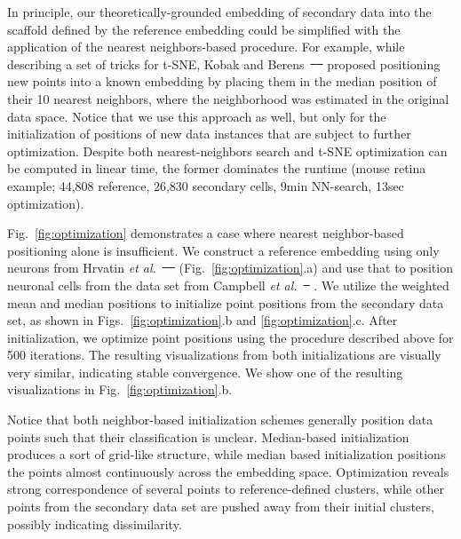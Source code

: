 \documentclass[runningheads]{llncs}
\newcommand{\etal}{\textit{et al.}}
\providecommand{\DIFaddtex}[1]{{\protect\color{blue}\uwave{#1}}} %
\providecommand{\DIFdeltex}[1]{{\protect\color{red}\sout{#1}}}                      %
\providecommand{\DIFaddbegin}{} %
\providecommand{\DIFaddend}{} %
\providecommand{\DIFdelbegin}{} %
\providecommand{\DIFdelend}{} %
\providecommand{\DIFadd}[1]{\texorpdfstring{\DIFaddtex{#1}}{#1}} %
\providecommand{\DIFdel}[1]{\texorpdfstring{\DIFdeltex{#1}}{}} %
\newcommand{\DIFscaledelfig}{0.5}
\newlength{\DIFdelgraphicswidth} %
\newlength{\DIFdelgraphicsheight} %
\newcommand{\DIFaddincludegraphics}[2][]{{\color{blue}\fbox{\DIFOincludegraphics[#1]{#2}}}} %
\newcommand{\DIFdelincludegraphics}[2][]{%
\sbox{\DIFdelgraphicsbox}{\DIFOincludegraphics[#1]{#2}}%
\settoboxwidth{\DIFdelgraphicswidth}{\DIFdelgraphicsbox} %
\settoboxtotalheight{\DIFdelgraphicsheight}{\DIFdelgraphicsbox} %
\scalebox{\DIFscaledelfig}{%
\parbox[b]{\DIFdelgraphicswidth}{\usebox{\DIFdelgraphicsbox}\\[-\baselineskip] \rule{\DIFdelgraphicswidth}{0em}}\llap{\resizebox{\DIFdelgraphicswidth}{\DIFdelgraphicsheight}{%
\setlength{\unitlength}{\DIFdelgraphicswidth}%
\begin{picture}(1,1)%
\thicklines\linethickness{2pt} %
{\color[rgb]{1,0,0}\put(0,0){\framebox(1,1){}}}%
{\color[rgb]{1,0,0}\put(0,0){\line( 1,1){1}}}%
{\color[rgb]{1,0,0}\put(0,1){\line(1,-1){1}}}%
\end{picture}%
}\hspace*{3pt}}} %
} %
\DeclareRobustCommand{\DIFaddbegin}{\DIFOaddbegin \let\includegraphics\DIFaddincludegraphics} %
\DeclareRobustCommand{\DIFaddend}{\DIFOaddend \let\includegraphics\DIFOincludegraphics} %
\DeclareRobustCommand{\DIFdelbegin}{\DIFOdelbegin \let\includegraphics\DIFdelincludegraphics} %
\DeclareRobustCommand{\DIFdelend}{\DIFOaddend \let\includegraphics\DIFOincludegraphics} %
\begin{document}
\DIFaddend In principle, our theoretically-grounded embedding of secondary data into the
scaffold defined by the reference embedding could be simplified with the
application of the nearest neighbors-based procedure. For example, while
describing a set of tricks for t-SNE, Kobak and Berens~\DIFdelbegin \DIFdel{\mbox{%
\cite{art_of_using_tsne}
}\hspace{0pt}%
}\DIFdelend \DIFaddbegin \DIFadd{\mbox{%
\cite{Kobak2019}
}\hspace{0pt}%
}\DIFaddend proposed positioning new points into a known embedding by placing them in the
median position of their 10 nearest neighbors, where the neighborhood was
estimated in the original data space. Notice that we use this approach as well,
but only for the initialization of positions of new data instances that are
subject to further optimization. Despite both nearest-neighbors search and
t-SNE optimization can be computed in linear time, the former dominates the
runtime (mouse retina example; 44,808 reference, 26,830 secondary cells,
9min NN-search, 13sec optimization).

Fig.~\ref{fig:optimization} demonstrates a case where nearest neighbor-based 
positioning alone is insufficient. We construct a reference embedding using only
neurons from Hrvatin \etal~\DIFdelbegin \DIFdel{\mbox{%
\cite{hrvatin2018} }\hspace{0pt}%
}\DIFdelend \DIFaddbegin \DIFadd{\mbox{%
\cite{Hrvatin2018} }\hspace{0pt}%
}\DIFaddend (Fig.~\ref{fig:optimization}.a)
and use that to position neuronal
cells from the data set from Campbell \etal~\DIFdelbegin \DIFdel{\mbox{%
\cite{campbell2017}}\hspace{0pt}%
}\DIFdelend \DIFaddbegin \DIFadd{\mbox{%
\cite{Campbell2017}}\hspace{0pt}%
}\DIFaddend . We utilize the
weighted mean and median positions to initialize point positions from the secondary
data set, as shown in Figs.~\ref{fig:optimization}.b and \ref{fig:optimization}.c.
After initialization, we optimize point positions using the procedure described
above for 500 iterations. The resulting visualizations from both initializations
are visually very similar, indicating stable convergence. We show one of the resulting
visualizations in Fig.~\ref{fig:optimization}.b.

Notice that both neighbor-based initialization schemes generally position data points
such that their classification is unclear. Median-based initialization produces
a sort of grid-like structure, while median based initialization positions the points
almost continuously across the embedding space. Optimization reveals strong
correspondence of several points to reference-defined clusters, while other points
from the secondary data set are pushed away from their initial clusters, possibly
indicating dissimilarity.
\end{document}
